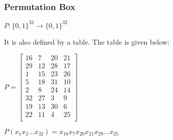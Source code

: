 \documentclass[11pt]{article}
\begin{document}
\subsubsection{Permutation Box}
\begin{center}
    $P: \{0, 1\}^{32} \rightarrow \{0, 1\}^{32}$\\
\end{center}
It is also defined by a table. The table is given below:
\begin{center}
    $ P = 
    \begin{bmatrix}
        16 & 7 & 20 & 21\\
        29 & 12 & 28 & 17\\
        1 & 15 & 23 & 26\\
        5 & 18 & 31 & 10\\
        2 & 8 & 24 & 14\\
        32 & 27 & 3 & 9\\
        19 & 13 & 30 & 6\\
        22 & 11 & 4 & 25\\
    \end{bmatrix}$\\
\end{center}
\begin{center}
    $P(x_1x_2...x_{32}) = x_{16}x_7x_{20}x_{21}x_{29}...x_{25}$
\end{center}
\end{document}
